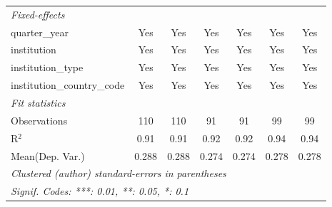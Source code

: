 \begin{tabular}{lcccccc}
   \midrule
   \emph{Fixed-effects}\\
   quarter\_year                      & Yes            & Yes            & Yes          & Yes          & Yes            & Yes\\  
   institution                        & Yes            & Yes            & Yes          & Yes          & Yes            & Yes\\  
   institution\_type                  & Yes            & Yes            & Yes          & Yes          & Yes            & Yes\\  
   institution\_country\_code         & Yes            & Yes            & Yes          & Yes          & Yes            & Yes\\  
   \midrule
   \emph{Fit statistics}\\
   Observations                       & 110            & 110            & 91           & 91           & 99             & 99\\  
   R$^2$                              & 0.91           & 0.91           & 0.92         & 0.92         & 0.94           & 0.94\\  
Mean(Dep. Var.) & 0.288 & 0.288 & 0.274 & 0.274 & 0.278 & 0.278 \\
   \midrule \midrule
   \multicolumn{7}{l}{\emph{Clustered (author) standard-errors in parentheses}}\\
   \multicolumn{7}{l}{\emph{Signif. Codes: ***: 0.01, **: 0.05, *: 0.1}}\\
\end{tabular}
\par\endgroup
